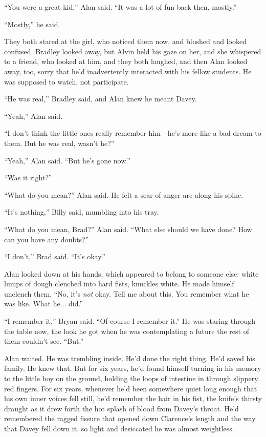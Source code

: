 \documentclass{article}
\begin{document}
``You were a great kid,'' Alan said.  ``It was a lot of fun back then,
mostly.''

``Mostly,'' he said.

They both stared at the girl, who noticed them now, and blushed and
looked confused.  Bradley looked away, but Alvin held his gaze on her,
and she whispered to a friend, who looked at him, and they both
laughed, and then Alan looked away, too, sorry that he'd inadvertently
interacted with his fellow students.  He was supposed to watch, not
participate.

``He was real,'' Bradley said, and Alan knew he meant Davey.

``Yeah,'' Alan said.

``I don't think the little ones really remember him---he's more like a
bad dream to them.  But he was real, wasn't he?''

``Yeah,'' Alan said.  ``But he's gone now.''

``Was it right?''

``What do you mean?'' Alan said.  He felt a sear of anger arc along
his spine.

``It's nothing,'' Billy said, mumbling into his tray.

``What do you mean, Brad?'' Alan said.  ``What else should we have
done?  How can you have any doubts?''

``I don't,'' Brad said.  ``It's okay.''

Alan looked down at his hands, which appeared to belong to someone
else:  white lumps of dough clenched into hard fists, knuckles white. 
He made himself unclench them.  ``No, it's \textit{not} okay.  Tell me
about this.  You remember what he was like.  What he...  did.''

``I remember it,'' Bryan said.  ``Of course I remember it.'' He was
staring through the table now, the look he got when he was
contemplating a future the rest of them couldn't see.  ``But.''

Alan waited.  He was trembling inside.  He'd done the right thing. 
He'd saved his family.  He knew that.  But for six years, he'd found
himself turning in his memory to the little boy on the ground, holding
the loops of intestine in through slippery red fingers.  For six
years, whenever he'd been somewhere quiet long enough that his own
inner voices fell still, he'd remember the hair in his fist, the
knife's thirsty draught as it drew forth the hot splash of blood from
Davey's throat.  He'd remembered the ragged fissure that opened down
Clarence's length and the way that Davey fell down it, so light and
desiccated he was almost weightless.
\end{document}
